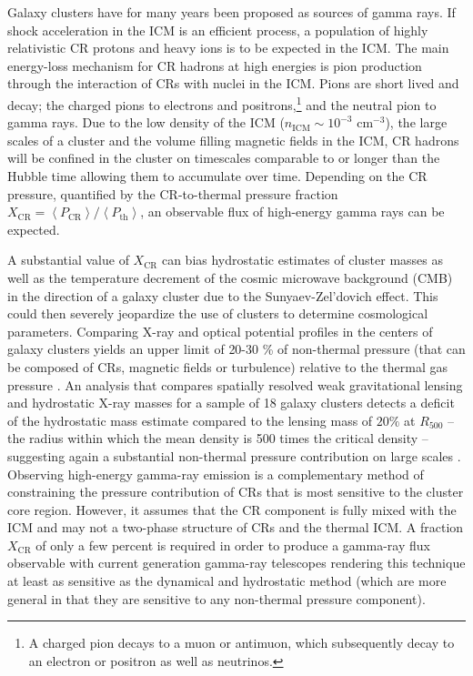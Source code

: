 \documentclass[12pt,manuscript]{aastex}
\newcommand{\expval}[1]{\left\langle #1 \right\rangle}
\newcommand{\CR}{\mathrm{CR}}
\begin{document}
Galaxy clusters have for many years been proposed as sources of gamma rays. If shock acceleration
in the ICM is an efficient process, a population of highly relativistic CR protons and heavy ions is to
be expected in the ICM. The main energy-loss mechanism for CR hadrons at high energies is pion
production through the interaction of CRs with nuclei in the ICM. Pions are short lived and decay; the
charged pions to electrons and positrons,\footnote{A charged pion decays to a muon or antimuon,
which subsequently decay to an electron or positron as well as neutrinos.} and the neutral pion to
gamma rays. Due to the low density of the ICM ($n_{\mathrm{ICM}}\sim 10^{-3}$ cm$^{-3}$), the large
scales of a cluster and the volume filling magnetic fields in the ICM, CR hadrons will be confined in
the cluster on timescales comparable to or longer than the Hubble time \citep[][]{article:Volk_etal:1996,
article:Berezinsky_etal:1997} allowing them to accumulate over time. Depending on the CR pressure,
quantified by the CR-to-thermal pressure fraction
$X_\CR=\expval{P_{\CR}}/\expval{P_{\mathrm{th}}}$, an observable flux of high-energy gamma rays
can be expected.

A substantial value of $X_\CR$ can bias hydrostatic estimates of cluster masses as well as the
temperature decrement of the cosmic microwave background (CMB) in the direction of a galaxy cluster
due to the Sunyaev-Zel'dovich effect. This could then severely jeopardize the use of clusters to
determine cosmological parameters. Comparing X-ray and optical potential profiles in the centers of
galaxy clusters yields an upper limit of 20-30 \% of non-thermal pressure (that can be composed of
CRs, magnetic fields or turbulence) relative to the thermal gas pressure
\citep{article:Churazov_etal:2008, article:Churazov_etal:2010}. An analysis that compares spatially
resolved weak gravitational lensing and hydrostatic X-ray masses for a sample of 18 galaxy clusters
detects a deficit of the hydrostatic mass estimate compared to the lensing mass of $20 \%$ at
$R_{500}$ -- the radius within which the mean density is 500 times the critical density --
suggesting again a substantial non-thermal pressure contribution on large scales
\citep{article:Mahdavi_etal:2008}. Observing high-energy gamma-ray emission is a complementary
method of constraining the pressure contribution of CRs that is most sensitive to the cluster core
region. However, it assumes that the CR component is fully mixed with the ICM and may not a
two-phase structure of CRs and the thermal ICM. A fraction $X_\CR$ of only a few percent is
required in order to produce a gamma-ray flux observable with current generation gamma-ray
telescopes rendering this technique at least as sensitive as the dynamical and hydrostatic method
(which are more general in that they are sensitive to any non-thermal pressure component).
\end{document}
